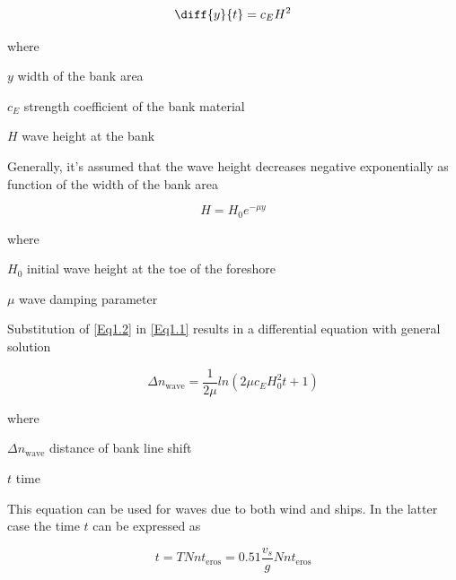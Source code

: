 \begin{equation}
\diff{y}{t} = c_E H^2
\label{Eq1.1}
\end{equation}

where

\begin{symbollist}
\item[$y$] width of the bank area 
\item[$c_E$] strength coefficient of the bank material 
\item[$H$] wave height at the bank 
\end{symbollist}

Generally, it's assumed that the wave height decreases negative exponentially as function of the width of the bank area

\begin{equation}
H = H_0 e^{-\mu y}
\label{Eq1.2}
\end{equation}

where

\begin{symbollist}
\item[$H_0$] initial wave height at the toe of the foreshore 
\item[$\mu$] wave damping parameter 
\end{symbollist}

Substitution of \autoref{Eq1.2} in \autoref{Eq1.1} results in a differential equation with general solution

\begin{equation}
\Delta n_\text{wave} = \frac{1}{2 \mu} ln ( 2 \mu c_E H_0^2 t + 1 )
\end{equation}

where

\begin{symbollist}
\item[$\Delta n_\text{wave}$] distance of bank line shift 
\item[$t$] time 
\end{symbollist}

This equation can be used for waves due to both wind and ships.
In the latter case the time $t$ can be expressed as

\begin{equation}
t = T N n t_\text{eros} = 0.51 \frac{v_s}{g} N n t_\text{eros}
\end{equation}

